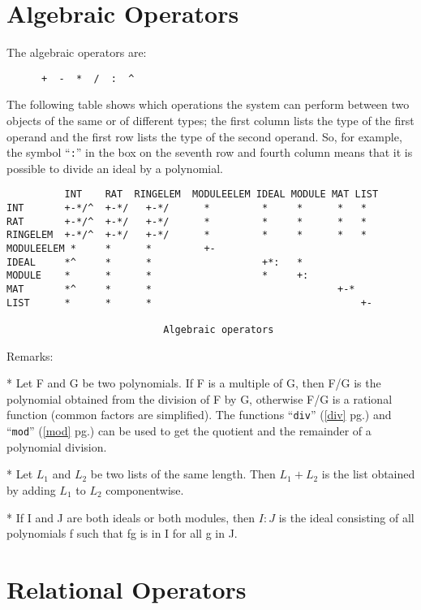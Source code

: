 \documentclass[a4paper]{mybook}
\begin{document}
\section{Algebraic Operators}
\label{Algebraic Operators}

        
The algebraic operators are:
\begin{verbatim}
      +  -  *  /  :  ^
\end{verbatim}
The following table shows which operations the system can perform
between two objects of the same or of different types; the first
column lists the type of the first operand and the first row lists the
type of the second operand. So, for example, the symbol ``\verb&:&'' in the box
on the seventh row and fourth column means that it is possible to
divide an ideal by a polynomial.
\begin{verbatim}
          INT    RAT  RINGELEM  MODULEELEM IDEAL MODULE MAT LIST
INT       +-*/^  +-*/   +-*/      *         *     *      *   *
RAT       +-*/^  +-*/   +-*/      *         *     *      *   *
RINGELEM  +-*/^  +-*/   +-*/      *         *     *      *   *
MODULEELEM *     *      *         +-
IDEAL     *^     *      *                   +*:   *
MODULE    *      *      *                   *     +:
MAT       *^     *      *                                +-*
LIST      *      *      *                                    +-

                           Algebraic operators
\end{verbatim}
Remarks:
\par 
  * Let F and G be two polynomials. If F is a multiple of G, then
    F/G is the polynomial obtained from the division of F by G,
    otherwise F/G is a rational function (common factors are
    simplified). The functions ``\verb&div&'' (\ref{div} pg.\pageref{div}) and ``\verb&mod&'' (\ref{mod} pg.\pageref{mod}) can be used to get the
    quotient and the remainder of a polynomial division.
\par 
  * Let $L_1$ and $L_2$ be two lists of the same length. Then $L_1 + L_2$ is
    the list obtained by adding $L_1$ to $L_2$ componentwise.
\par 
  * If I and J are both ideals or both modules, then $I : J$ is the
    ideal consisting of all polynomials f such that fg is in I for all
    g in J.


\section{Relational Operators}
\label{Relational Operators}
\end{document}

